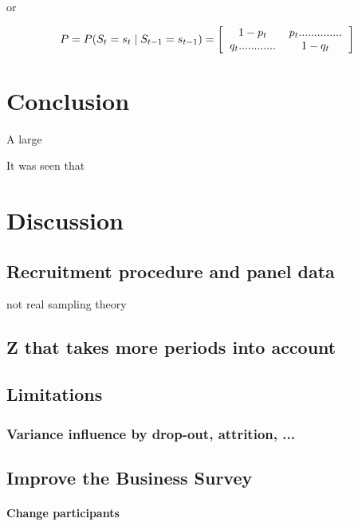 \documentclass[12pt,a4paper,oneside]{book}
\begin{document}
or 

\begin{equation}
    P = P(S_t = s_t \mid S_{t-1} = s_{t-1}) = 
\left[ \begin{tabular}{c c}
            $1 - p_{t}$	& $p_{t} ..............$ \\ 
            $q_{t} ............$	& $1 - q_{t}$ \\ 
\end{tabular} \right]
\end{equation}






\chapter{Conclusion}

A large 

It was seen that


\chapter{Discussion}

\section*{Recruitment procedure and panel data}
not real sampling theory



\section*{Z that takes more periods into account}



\section*{Limitations}

\subsection*{Variance influence by drop-out, attrition, ...}

\section*{Improve the Business Survey}

\subsubsection*{Change participants}
\end{document}
